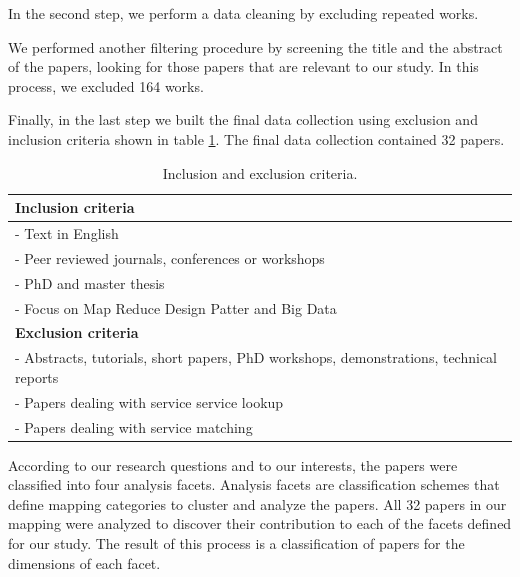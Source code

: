 In the second step, we perform a data cleaning by excluding repeated works.  

We performed another filtering procedure by screening the title and the abstract
of the papers, looking for those papers that are relevant to our study.
In this process, we excluded 164 works. 
 
Finally, in the last step we built the final data collection using exclusion
and inclusion criteria shown in table \ref{table:criteria}. The final data
collection contained 32 papers.

\begin{table}\centering \small
\begin{tabular}{|l|} \hline
\textbf{Inclusion criteria}		\\ \hline\hline
- Text in English								\\ \hline
- Peer reviewed journals, conferences or workshops	\\ \hline
- PhD and master thesis	\\ \hline
- Focus on Map Reduce Design Patter and Big Data				\\ \hline\hline
\textbf{Exclusion criteria}		\\ \hline\hline
- Abstracts, tutorials, short papers, PhD workshops, demonstrations, technical reports		\\ \hline
- Papers dealing with service service lookup		\\ \hline
- Papers dealing with service matching 	\\ \hline
\end{tabular}
\caption{\label{table:criteria} Inclusion and exclusion criteria.}
\end{table}


According to our research questions and to our interests, the papers were
classified into four analysis facets.
Analysis facets are classification schemes  that define mapping categories to cluster and analyze the papers. 
All 32 papers in our mapping were analyzed to discover their contribution to
each of the facets defined for our study.
The result of this process is a classification of papers for the dimensions of each facet.

